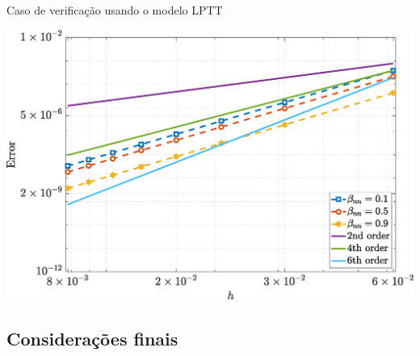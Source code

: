 \begin{frame}{Caso de verificação usando o modelo LPTT}
\begin{minipage}{0.325\textwidth}
        \label{lptt_txy_Case11}
    \end{minipage}
    \hfill
    \begin{minipage}{0.325\textwidth}
        \centering
        \includegraphics[width=\textwidth]{Figures/NormErr_2nd_Re_100_Wi_1_epsilon_0_xi_0_alphaG_0_Dt_1e-06_at_0.05_tipsim_1_MMS_12_Tyy.eps}
        \label{lptt_tyy_Case11}
    \end{minipage}
\end{frame}

\subsection{Considerações finais}

